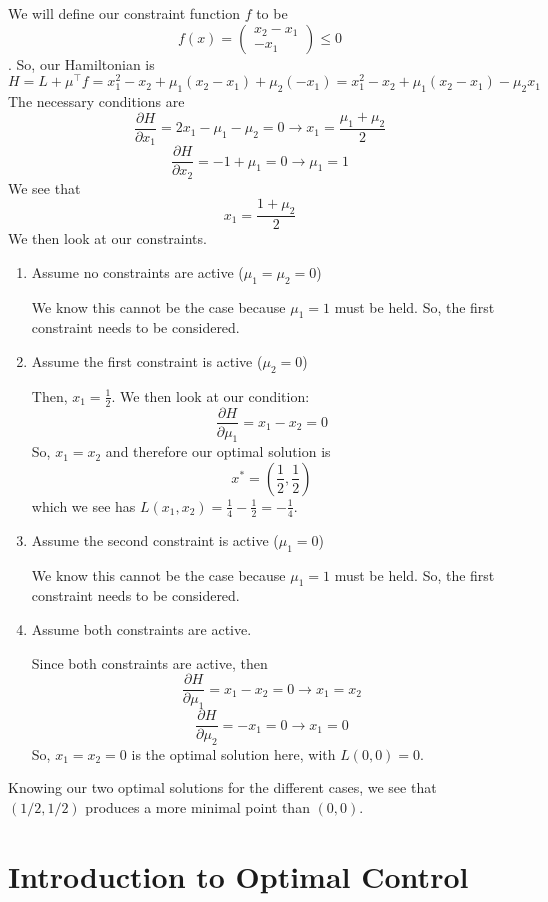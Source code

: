 \documentclass{article}
\begin{document}
\noindent
We will define our constraint function $f$ to be
\[f(x) = \left(\begin{matrix}
    x_2 - x_1 \\
    -x_1
\end{matrix}\right) \le 0\]. So, our Hamiltonian is
\[H = L + \mu^\top f = x_1^2 - x_2 + \mu_1(x_2-x_1) + \mu_2(-x_1)
= x_1^2 - x_2 + \mu_1(x_2-x_1) - \mu_2x_1\]
The necessary conditions are
\[\frac{\partial H}{\partial x_1} = 2x_1 - \mu_1 - \mu_2 = 0 \rightarrow x_1 = \frac{\mu_1+\mu_2}{2}\]
\[\frac{\partial H}{\partial x_2} = -1 + \mu_1 = 0 \rightarrow \mu_1 = 1\]
We see that
\[x_1 = \frac{1+\mu_2}{2}\]
We then look at our constraints.
\begin{enumerate}
    \item Assume no constraints are active ($\mu_1 = \mu_2 = 0$)

    \noindent
    We know this cannot be the case because $\mu_1 = 1$ must be held. So, the first constraint
    needs to be considered.
    \item Assume the first constraint is active ($\mu_2 = 0$)

    \noindent
    Then, $x_1 = \frac{1}{2}$. We then look at our condition:
    \[\frac{\partial H}{\partial \mu_1} = x_1 - x_2 = 0\]
    So, $x_1 = x_2$ and therefore our optimal solution is
    \[x^* = \left(\frac{1}{2},\frac{1}{2}\right)\]
    which we see has $L(x_1,x_2) = \frac{1}{4} - \frac{1}{2} = -\frac{1}{4}$.
    \item Assume the second constraint is active ($\mu_1 = 0$)

    \noindent
    We know this cannot be the case because $\mu_1 = 1$ must be held. So, the first constraint
    needs to be considered.
    \item Assume both constraints are active.
    
    \noindent
    Since both constraints are active, then
    \[\frac{\partial H}{\partial \mu_1} = x_1 - x_2 = 0 \rightarrow x_1 = x_2\]
    \[\frac{\partial H}{\partial \mu_2} = -x_1 = 0 \rightarrow x_1 = 0\]
    So, $x_1 = x_2 = 0$ is the optimal solution here, with $L(0,0) = 0$.
\end{enumerate}
Knowing our two optimal solutions for the different cases, we see that $(1/2, 1/2)$
produces a more minimal point than $(0,0)$.

\section{Introduction to Optimal Control}
\end{document}
